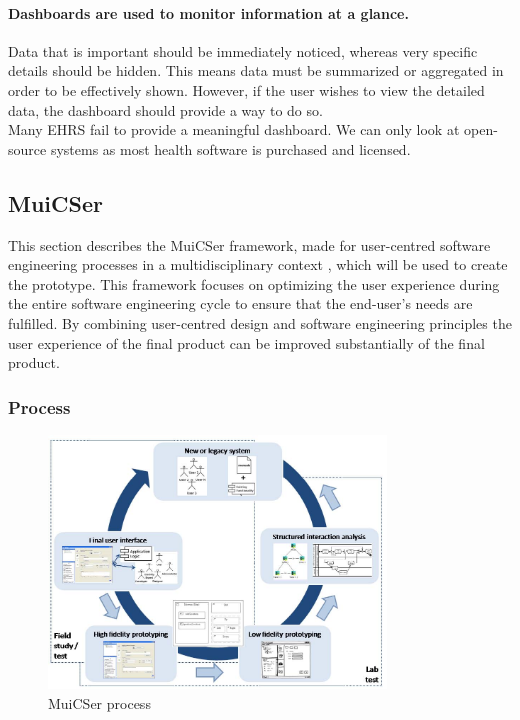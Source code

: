     \paragraph{Dashboards are used to monitor information at a glance.} Data that is important should be immediately noticed, whereas very specific details should be hidden. This means data must be summarized or aggregated in order to be effectively shown. However, if the user wishes to view the detailed data, the dashboard should provide a way to do so.\\

    \noindent Many EHRS fail to provide a meaningful dashboard. We can only look at open-source systems as most health software is purchased and licensed.


    \subsection{MuiCSer} \label{2_muicser}
    This section describes the MuiCSer framework, made for user-centred software engineering processes in a multidisciplinary context \cite{muicser}, which will be used to create the prototype. This framework focuses on optimizing the user experience during the entire software engineering cycle to ensure that the end-user's needs are fulfilled. By combining user-centred design and software engineering principles the user experience of the final product can be improved substantially of the final product.

        \subsubsection{Process}
        
        \begin{figure}[!t]
            \centering
            \includegraphics[width=0.8\textwidth]{chapters/2_background/muicser}
            \caption{MuiCSer process}\label{fig:muicser}
        \end{figure}

